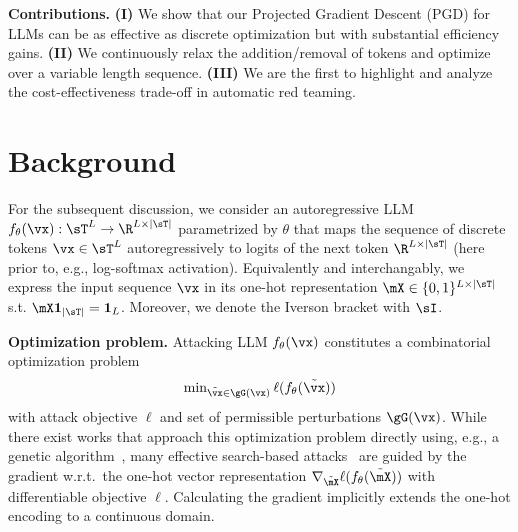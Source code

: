 \documentclass{article}
\theoremstyle{plain}
\theoremstyle{definition}
\theoremstyle{remark}
\begin{document}
\textbf{Contributions.} \textbf{(I)} We show that our Projected Gradient Descent (PGD) for LLMs can be as effective as discrete optimization but with substantial efficiency gains. \textbf{(II)} We continuously relax the addition/removal of tokens and optimize over a variable length sequence. \textbf{(III)} We are the first to highlight and analyze the cost-effectiveness trade-off in automatic red teaming.

\section{Background}\label{sec:background}

For the subsequent discussion, we consider an autoregressive LLM \(f_\theta(\vx): \sT^{L} \to \R^{L\times|\sT|}\) parametrized by \(\theta\) that maps the sequence of discrete tokens \(\vx \in \sT^{L}\) autoregressively to logits of the next token $\R^{L\times|\sT|}$ (here prior to, e.g., log-softmax activation). Equivalently and interchangably, we express the input sequence \(\vx\) in its one-hot representation \(\mX \in \{0,1\}^{L\times|\sT|}\) s.t. \(\mX \mathbf{1}_{|\sT|} = \mathbf{1}_{L}\). Moreover, we denote the Iverson bracket with \(\sI\).

\textbf{Optimization problem.} Attacking LLM \(f_\theta(\vx)\) constitutes a combinatorial optimization problem
\begin{equation}\label{eq:attack}
    \min\nolimits_{\tilde{\vx} \in \gG(\vx)} \ell(f_\theta(\tilde{\vx}))
\end{equation}
with attack objective \(\ell\) and set of permissible perturbations \(\gG(\vx)\). While there exist works that approach this optimization problem directly using, e.g., a genetic algorithm~\citep{lapid_open_2023}, many effective search-based attacks~\citep{zou_universal_2023,zhu_autodan_2023} are guided by the gradient w.r.t.\ the one-hot vector representation \(\nabla_{\tilde{\mX}} \ell(f_\theta(\tilde{\mX}))\) with differentiable objective \(\ell\). Calculating the gradient implicitly extends the one-hot encoding to a continuous domain. %
\end{document}
